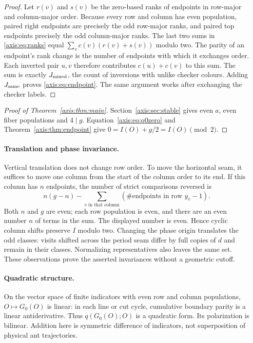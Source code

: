 \begin{proof}
Let $r(v)$ and $s(v)$ be the zero-based ranks of endpoints in row-major and
column-major order. Because every row and column has even population, paired
right endpoints are precisely the odd row-major ranks, and paired top
endpoints precisely the odd column-major ranks. The last two sums in
\eqref{axis:eq:ranks} equal $\sum_vc(v)(r(v)+s(v))$ modulo two.
The parity of an endpoint's rank change is the number of endpoints with which
it exchanges order. Each inverted pair $u,v$ therefore contributes
$c(u)+c(v)$ to this sum. The sum is exactly $J_{\rm mixed}$, the count of
inversions with unlike checker colours. Adding $J_{\rm same}$ proves
\eqref{axis:eq:endpoint}. The same argument works after exchanging the checker labels.
\end{proof}

\begin{proof}[Proof of Theorem~\ref{axis:thm:main}]
Section~\ref{axis:sec:stable} gives even $a$, even fiber populations and $4\mid g$.
Equation~\eqref{axis:eq:q0zero} and Theorem~\ref{axis:thm:endpoint} give
$0=I(O)+g/2=I(O)\pmod2$.
\end{proof}

\paragraph{Translation and phase invariance.}
Vertical translation does not change row order. To move the horizontal seam,
it suffices to move one column from the start of the column order to its end.
If this column has $n$ endpoints, the number of strict comparisons reversed is
\[
 n(g-n)-\sum_{v\text{ in that column}}(\#\text{endpoints in row }y_v-1).
\]
Both $n$ and $g$ are even; each row population is even, and there are an even
number $n$ of terms in the sum. The displayed number is even. Hence cyclic
column shifts preserve $I$ modulo two. Changing the phase origin translates
the odd classes: visits shifted across the period seam differ by full copies
of $d$ and remain in their classes. Normalizing representatives also leaves
the same set. These observations prove the asserted invariances without a
geometric cutoff.

\paragraph{Quadratic structure.}
On the vector space of finite indicators with even row and column populations,
$O\mapsto G_0(O)$ is linear: in each line or cut cycle, cumulative boundary
parity is a linear antiderivative. Thus $q(G_0(O);O)$ is a quadratic form.
Its polarization is bilinear. Addition here is symmetric difference of
indicators, not superposition of physical ant trajectories.

